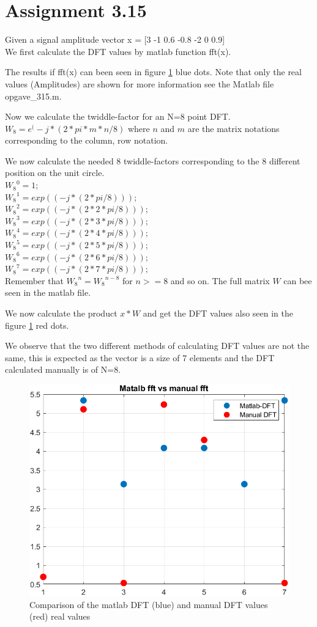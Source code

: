 \section{Assignment 3.15}

Given a signal amplitude vector x = [3 -1 0.6 -0.8  -2 0 0.9]\\

We first calculate the DFT values by matlab function fft(x).

The results if fft(x) can been seen in figure \ref{fig:opg315} blue dots. Note that only the real values (Amplitudes) are shown for more information see the Matlab file opgave\_315.m.

Now we calculate the twiddle-factor for an N=8 point DFT.
$W_8 = e^(-j*(2*pi*m*n/8)$ where $n$ and $m$ are the matrix notations corresponding to the column, row notation.

We now calculate the needed 8 twiddle-factors corresponding to the 8 different position on the unit circle.\\
${W_8}^0 = 1;$\\
${W_8}^1 = exp((-j*(2*pi/8)));$\\
${W_8}^2 = exp((-j*(2*2*pi/8)));$\\
${W_8}^3 = exp((-j*(2*3*pi/8)));$\\
${W_8}^4 = exp((-j*(2*4*pi/8)));$\\
${W_8}^5 = exp((-j*(2*5*pi/8)));$\\
${W_8}^6 = exp((-j*(2*6*pi/8)));$\\
${W_8}^7 = exp((-j*(2*7*pi/8)));$\\
 
Remember that ${W_8}^n = {W_8}^{n-8}$ for $n>=8$ and so on. 
The full matrix $W$ can bee seen in the matlab file.

We now calculate the product $x*W$ and get the DFT values also seen in the figure \ref{fig:opg315} red dots. 

We observe that the two different methods of calculating DFT values are not the same, this is expected as the vector is a size of 7 elements and the DFT calculated manually is of N=8.

\begin{figure}[h]
    \centering
    \includegraphics[width=1\textwidth]{matlabStuff/opg315.PNG}
     \caption{Comparison of the matlab DFT (blue) and manual DFT values (red) real values}
    \label{fig:opg315}
\end{figure}
